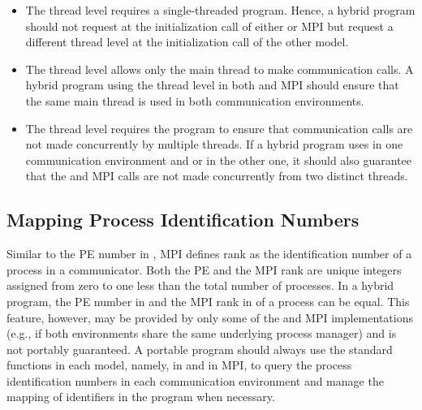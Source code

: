 \begin{itemize}
    \item The  thread level requires a single-threaded program.
    Hence, a hybrid program should not request  at the initialization
    call of either \openshmem or \ac{MPI} but request a different thread level at the
    initialization call of the other model.

    \item The  thread level allows only the main thread to
    make communication calls. A hybrid program using the 
    thread level in both \openshmem and \ac{MPI} should ensure that the same main thread
    is used in both communication environments.

    \item The  thread level requires the program to ensure
    that communication calls are not made concurrently by multiple threads. If a
    hybrid program uses  in one communication environment
    and  or  in the other one, it
    should also guarantee that the \openshmem and \ac{MPI} calls are not made concurrently
    from two distinct threads.
\end{itemize}

\subsection{Mapping Process Identification Numbers}
\label{subsec:interoperability:id}

Similar to the \ac{PE} number in \openshmem, \ac{MPI} defines rank as the
identification number of a process in a communicator. Both the \openshmem \ac{PE}
and the \ac{MPI} rank are unique integers assigned from zero to one less than the total
number of processes. In a hybrid program, the \openshmem
\ac{PE} number in 
and the \ac{MPI} rank in  of a process can be equal.
This feature, however, may be provided by only some of the \openshmem and \ac{MPI}
implementations (e.g., if both environments share the same underlying process
manager) and is not portably guaranteed. A portable program should always
use the standard functions in each model, namely,  in \openshmem
and  in \ac{MPI}, to query the process identification numbers
in each communication environment and manage the mapping of identifiers in the
program when necessary.

